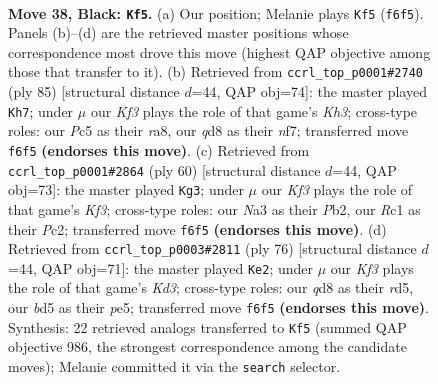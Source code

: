 \documentclass[11pt]{article}
\begin{document}
\clearpage

\begin{figure}[p]\centering
\begin{subfigure}{0.46\textwidth}\centering
\resizebox{\linewidth}{!}{%
\newchessgame
\chessboard[
  setfen={3Q4/6b1/1p3kp1/2pB4/7P/n5pK/3NR3/2r5 b - - 5 38},
  showmover=false,
  pgfstyle=straightmove, color=movearrow, markmove={f6-f5}
]}
\caption{}
\end{subfigure}\hfill
\begin{subfigure}{0.46\textwidth}\centering
\resizebox{\linewidth}{!}{%
\newchessgame
\chessboard[
  setfen={R7/3n1Nb1/6pk/2p4p/5P2/pr4PP/4BK2/8 b - - 3 43},
  showmover=false,
  pgfstyle=straightmove, color=movearrow, markmove={h6-h7}
]}
\caption{}
\end{subfigure}
\\[4pt]
\begin{subfigure}{0.46\textwidth}\centering
\resizebox{\linewidth}{!}{%
\newchessgame
\chessboard[
  setfen={7Q/3k4/p1p5/4p3/1b6/4BK2/1PP2P1P/3q4 w - - 5 31},
  showmover=false,
  pgfstyle=straightmove, color=movearrow, markmove={f3-g3}
]}
\caption{}
\end{subfigure}\hfill
\begin{subfigure}{0.46\textwidth}\centering
\resizebox{\linewidth}{!}{%
\newchessgame
\chessboard[
  setfen={8/6pB/p2n4/3rp1kP/8/1RPK4/2P2P2/8 w - - 1 39},
  showmover=false,
  pgfstyle=straightmove, color=movearrow, markmove={d3-e2}
]}
\caption{}
\end{subfigure}
\caption{\textbf{Move 38, Black: \texttt{Kf5}.} (a) Our position; Melanie plays \texttt{Kf5} (\texttt{f6f5}). Panels (b)--(d) are the retrieved master positions whose correspondence most drove this move (highest QAP objective among those that transfer to it). (b) Retrieved from \texttt{ccrl\_top\_p0001\#2740} (ply 85) [structural distance $d$=44, QAP obj=74]: the master played \texttt{Kh7}; under $\mu$ our \emph{Kf3} plays the role of that game's \emph{Kh3}; cross-type roles: our \emph{P}c5 as their \emph{r}a8, our \emph{q}d8 as their \emph{n}f7; transferred move \texttt{f6f5} \textbf{(endorses this move)}. (c) Retrieved from \texttt{ccrl\_top\_p0001\#2864} (ply 60) [structural distance $d$=44, QAP obj=73]: the master played \texttt{Kg3}; under $\mu$ our \emph{Kf3} plays the role of that game's \emph{Kf3}; cross-type roles: our \emph{N}a3 as their \emph{P}b2, our \emph{R}c1 as their \emph{P}c2; transferred move \texttt{f6f5} \textbf{(endorses this move)}. (d) Retrieved from \texttt{ccrl\_top\_p0003\#2811} (ply 76) [structural distance $d$=44, QAP obj=71]: the master played \texttt{Ke2}; under $\mu$ our \emph{Kf3} plays the role of that game's \emph{Kd3}; cross-type roles: our \emph{q}d8 as their \emph{r}d5, our \emph{b}d5 as their \emph{p}e5; transferred move \texttt{f6f5} \textbf{(endorses this move)}. Synthesis: 22 retrieved analogs transferred to \texttt{Kf5} (summed QAP objective 986, the strongest correspondence among the candidate moves); Melanie committed it via the \texttt{search} selector.}
\label{fig:thought-m75}
\end{figure}
\end{document}
